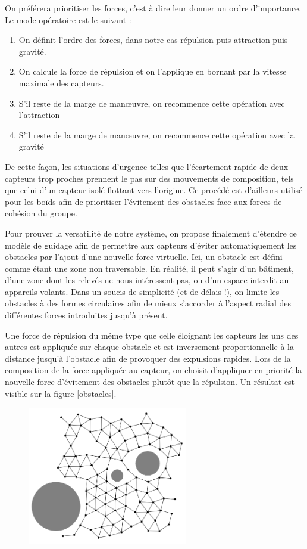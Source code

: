 \documentclass[10pt]{article}
\begin{document}
\begin{multicols}{2}
On préférera prioritiser les forces, c'est à dire leur donner un ordre
d'importance. Le mode opératoire est le suivant :

\begin{enumerate}
\item{On définit l'ordre des forces, dans notre cas répulsion puis
  attraction puis gravité.}
\item{On calcule la force de répulsion et on l'applique en bornant par
  la vitesse maximale des capteurs.}
\item{S'il reste de la marge de man\oe uvre, on recommence cette
  opération avec l'attraction}
\item{S'il reste de la marge de man\oe uvre, on recommence cette
  opération avec la gravité}
\end{enumerate}

De cette façon, les situations d'urgence telles que l'écartement
rapide de deux capteurs trop proches prennent le pas sur des
mouvements de composition, tels que celui d'un capteur isolé flottant
vers l'origine. Ce procédé est d'ailleurs utilisé pour les boïds afin
de prioritiser l'évitement des obstacles face aux forces de cohésion
du groupe.

Pour prouver la versatilité de notre système, on propose finalement
d'étendre ce modèle de guidage afin de permettre aux capteurs d'éviter
automatiquement les obstacles par l'ajout d'une nouvelle force
virtuelle. Ici, un obstacle est défini comme étant une zone non
traversable. En réalité, il peut s'agir d'un bâtiment, d'une zone dont
les relevés ne nous intéressent pas, ou d'un espace interdit au
appareils volants. Dans un soucis de simplicité (et de délais !), on
limite les obstacles à des formes circulaires afin de mieux s'accorder
à l'aspect radial des différentes forces introduites jusqu'à présent.

Une force de répulsion du même type que celle éloignant les capteurs
les uns des autres est appliquée sur chaque obstacle et est
inversement proportionnelle à la distance jusqu'à l'obstacle afin de
provoquer des expulsions rapides. Lors de la composition de la force
appliquée au capteur, on choisit d'appliquer en priorité la nouvelle
force d'évitement des obstacles plutôt que la répulsion. Un résultat
est visible sur la figure \ref{obstacles}.

\begin{figure}[H]

  \centering

  \includegraphics[width=7cm]{obstacles.png}


\end{figure}
\end{multicols}
\end{document}
